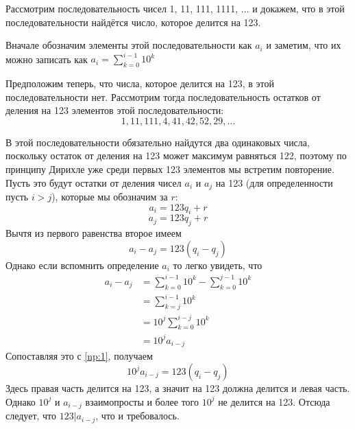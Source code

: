 \begin{example}
Рассмотрим последовательность чисел 1, 11, 111, 1111, $\ldots$ и докажем, что в этой последовательности найдётся число, которое делится на 123.

Вначале обозначим элементы этой последовательности как $a_i$ и заметим, что их можно записать как
$a_i = \sum_{k=0}^{i-1}10^k$

Предположим теперь, что числа, которое делится на 123, в этой последовательности нет. Рассмотрим тогда последовательность остатков от деления на 123 элементов этой последовательности:
$$1, 11, 111, 4, 41, 42, 52, 29, \ldots$$

В этой последовательности обязательно найдутся два одинаковых числа, поскольку остаток от деления на 123 может максимум равняться 122, поэтому по принципу Дирихле уже среди первых 123 элементов мы встретим повторение. Пусть это будут остатки от деления чисел $a_i$ и $a_j$ на 123 (для определенности пусть $i>j$), которые мы обозначим за $r$:
$$a_i = 123q_i + r$$
$$a_j = 123q_j + r$$
Вычтя из первого равенства второе имеем
\begin{equation}\label{np:1}
a_i - a_j = 123(q_i - q_j)
\end{equation}
Однако если вспомнить определение $a_i$ то легко увидеть, что
\begin{align*}
a_i - a_j &= \sum_{k=0}^{i-1}10^k - \sum_{k=0}^{j-1}10^k \\&= \sum_{k=j}^{i-1}10^k \\&= 10^j\sum_{k=0}^{i-j}10^k \\&= 10^j a_{i-j}
\end{align*}
Сопоставляя это с \eqref{np:1}, получаем
$$10^j a_{i-j} = 123(q_i - q_j)$$
Здесь правая часть делится на 123, а значит на 123 должна делится и левая часть. Однако $10^j$ и $a_{i-j}$ взаимопросты и более того $10^j$ не делится на 123. Отсюда следует, что $123|a_{i-j}$, что и требовалось.
\end{example}

